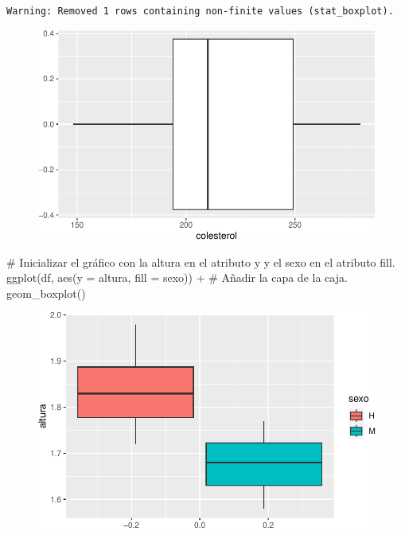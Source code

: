 \documentclass[
  a4paper,
]{scrreport}
\newenvironment{Shaded}{\begin{snugshade}}{\end{snugshade}}
\newcommand{\AttributeTok}[1]{\textcolor[rgb]{0.40,0.45,0.13}{#1}}
\newcommand{\CommentTok}[1]{\textcolor[rgb]{0.37,0.37,0.37}{#1}}
\newcommand{\FunctionTok}[1]{\textcolor[rgb]{0.28,0.35,0.67}{#1}}
\newcommand{\NormalTok}[1]{\textcolor[rgb]{0.00,0.23,0.31}{#1}}
\newcommand{\SpecialCharTok}[1]{\textcolor[rgb]{0.37,0.37,0.37}{#1}}
\theoremstyle{definition}
\theoremstyle{definition}
\theoremstyle{remark}
\begin{document}
\begin{verbatim}
Warning: Removed 1 rows containing non-finite values (stat_boxplot).
\end{verbatim}

\begin{figure}[H]

{\centering \includegraphics{./07-graficos_files/figure-pdf/unnamed-chunk-21-1.pdf}

}

\end{figure}

\begin{Shaded}
\begin{Highlighting}[]
\CommentTok{\# Inicializar el gráfico con la altura en el atributo y y el sexo en el atributo fill.}
\FunctionTok{ggplot}\NormalTok{(df, }\FunctionTok{aes}\NormalTok{(}\AttributeTok{y =}\NormalTok{ altura, }\AttributeTok{fill =}\NormalTok{ sexo)) }\SpecialCharTok{+}
\CommentTok{\# Añadir la capa de la caja.}
    \FunctionTok{geom\_boxplot}\NormalTok{()}
\end{Highlighting}
\end{Shaded}

\begin{figure}[H]

{\centering \includegraphics{./07-graficos_files/figure-pdf/unnamed-chunk-22-1.pdf}

}

\end{figure}
\end{document}
